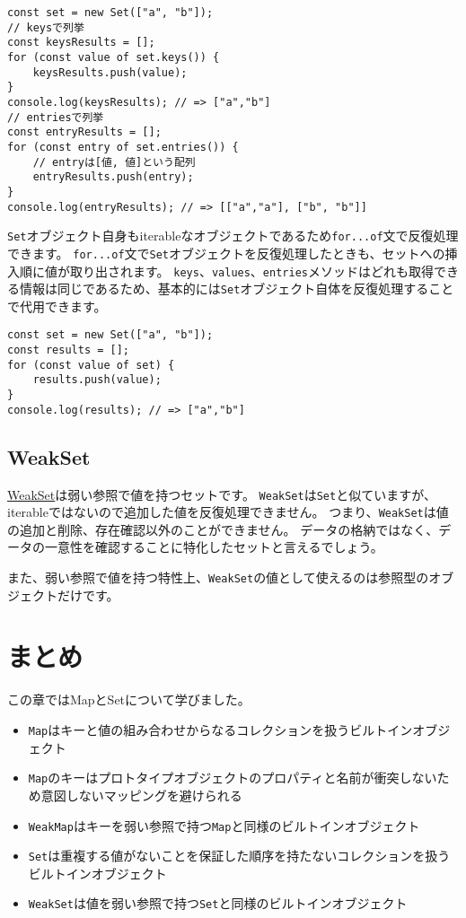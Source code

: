 \begin{lstlisting}
const set = new Set(["a", "b"]);
// keysで列挙
const keysResults = [];
for (const value of set.keys()) {
    keysResults.push(value);
}
console.log(keysResults); // => ["a","b"]
// entriesで列挙
const entryResults = [];
for (const entry of set.entries()) {
    // entryは[値, 値]という配列
    entryResults.push(entry);
}
console.log(entryResults); // => [["a","a"], ["b", "b"]]
\end{lstlisting}

\texttt{Set}オブジェクト自身もiterableなオブジェクトであるため\texttt{for...of}文で反復処理できます。
\texttt{for...of}文で\texttt{Set}オブジェクトを反復処理したときも、セットへの挿入順に値が取り出されます。
\texttt{keys}、\texttt{values}、\texttt{entries}メソッドはどれも取得できる情報は同じであるため、基本的には\texttt{Set}オブジェクト自体を反復処理することで代用できます。

\begin{lstlisting}
const set = new Set(["a", "b"]);
const results = [];
for (const value of set) {
    results.push(value);
}
console.log(results); // => ["a","b"]
\end{lstlisting}

\hypertarget{weakset}{%
\subsection{WeakSet}\label{weakset}}

\href{https://developer.mozilla.org/ja/docs/Web/JavaScript/Reference/Global_Objects/WeakSet}{WeakSet}は弱い参照で値を持つセットです。
\texttt{WeakSet}は\texttt{Set}と似ていますが、iterableではないので追加した値を反復処理できません。
つまり、\texttt{WeakSet}は値の追加と削除、存在確認以外のことができません。
データの格納ではなく、データの一意性を確認することに特化したセットと言えるでしょう。

また、弱い参照で値を持つ特性上、\texttt{WeakSet}の値として使えるのは参照型のオブジェクトだけです。

\hypertarget{conclusion}{%
\section{まとめ}\label{conclusion}}

この章ではMapとSetについて学びました。

\begin{itemize}
\item
  \texttt{Map}はキーと値の組み合わせからなるコレクションを扱うビルトインオブジェクト
\item
  \texttt{Map}のキーはプロトタイプオブジェクトのプロパティと名前が衝突しないため意図しないマッピングを避けられる
\item
  \texttt{WeakMap}はキーを弱い参照で持つ\texttt{Map}と同様のビルトインオブジェクト
\item
  \texttt{Set}は重複する値がないことを保証した順序を持たないコレクションを扱うビルトインオブジェクト
\item
  \texttt{WeakSet}は値を弱い参照で持つ\texttt{Set}と同様のビルトインオブジェクト
\end{itemize}
